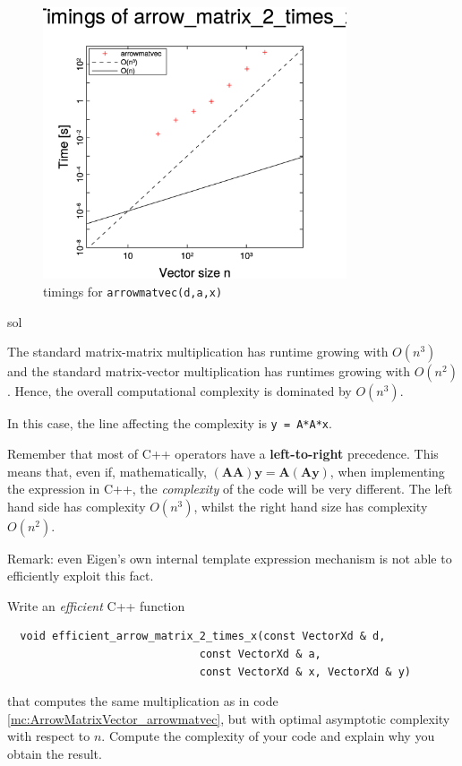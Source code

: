 \begin{samproblem}
\begin{subproblem}{}
 \begin{figure}[ht]
\centering
\includegraphics[width=0.8\textwidth]{./Assignments/Codes/MatVec/ArrowMatrix/arrowmatvec_timing.eps}
\caption{timings for \texttt{arrowmatvec(d,a,x)}}
\label{fig:arrowmatvectiming}
\end{figure}

 \begin{samwriteprbpart}{sol}
  \begin{samsolution}
  The standard matrix-matrix multiplication has runtime growing with $O(n^3)$ and the standard
  matrix-vector multiplication has runtimes growing with $O(n^2)$. Hence, the overall
  computational complexity is dominated by $O(n^3)$.

  In this case, the line affecting the complexity is \texttt{y = A*A*x}.

  Remember that most of C++ operators have a \textbf{left-to-right} precedence. This means that,
  even if,
  mathematically, $(\mathbf{A} \mathbf{A}) \mathbf{y} = \mathbf{A} (\mathbf{A} \mathbf{y})$, when
  implementing the expression in C++, the \emph{complexity} of the code will be very different. The left hand
  side has complexity $O(n^3)$, whilst the right hand size has complexity $O(n^2)$.

  Remark: even Eigen's own internal template expression mechanism is not
  able to efficiently exploit this fact.
\end{samsolution}
\end{samwriteprbpart}
\end{subproblem}

\begin{subproblem}{}
Write an \emph{efficient} C++ function
\begin{verbatim}
  void efficient_arrow_matrix_2_times_x(const VectorXd & d,
                              const VectorXd & a,
                              const VectorXd & x, VectorXd & y)
\end{verbatim}
that computes the same multiplication as in code \ref{mc:ArrowMatrixVector_arrowmatvec}, but
with optimal asymptotic complexity with respect to {$n$}. Compute the complexity of your code and
explain why you obtain the result.


\end{subproblem}
\end{samproblem}
